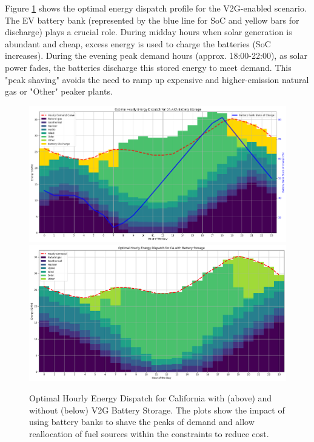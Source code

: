 \documentclass[12pt, letterpaper]{article}
\begin{document}
Figure \ref{fig:dispatch_with_v2g} shows the optimal energy dispatch profile for the V2G-enabled scenario. The EV battery bank (represented by the blue line for SoC and yellow bars for discharge) plays a crucial role. During midday hours when solar generation is abundant and cheap, excess energy is used to charge the batteries (SoC increases). During the evening peak demand hours (approx. 18:00-22:00), as solar power fades, the batteries discharge this stored energy to meet demand. This "peak shaving" avoids the need to ramp up expensive and higher-emission natural gas or "Other" peaker plants.

\begin{figure}[H]
    \centering
    \includegraphics[width=\textwidth]{dispatch_with_v2g.png}
    \includegraphics[width=\textwidth]{dispatch_no_v2g.png}
    \caption{Optimal Hourly Energy Dispatch for California with (above) and without (below) V2G Battery Storage. The plots show the impact of using battery banks to shave the peaks of demand and allow reallocation of fuel sources within the constraints to reduce cost.}
    \label{fig:dispatch_with_v2g}
\end{figure}
\end{document}
